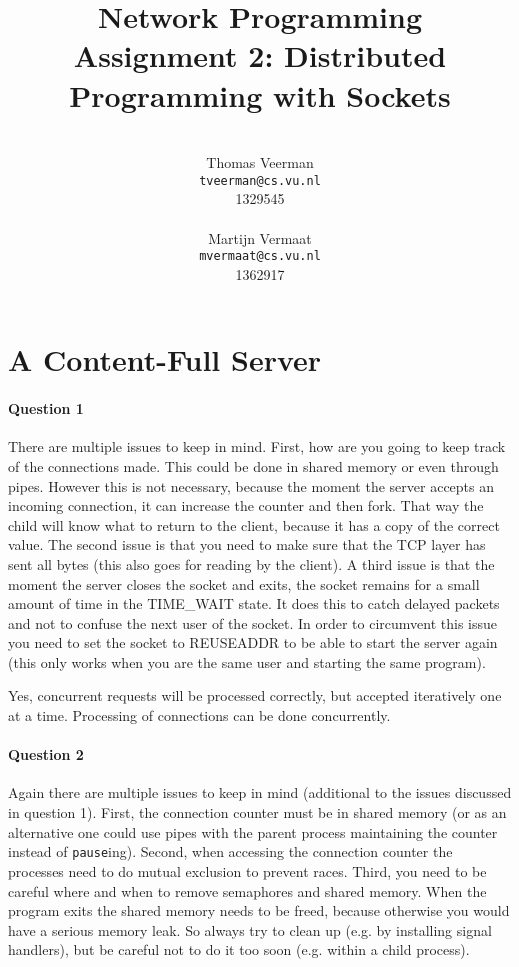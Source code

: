 \documentclass[a4paper,10pt]{article}
\title{Network Programming\\
\small{Assignment 2: Distributed Programming with Sockets}}
\author{%
        \mbox{}\\
        Thomas Veerman\\
        \texttt{tveerman@cs.vu.nl}\\
        1329545\\
        \mbox{}\\
        Martijn Vermaat\\
        \texttt{mvermaat@cs.vu.nl}\\
        1362917
}
\begin{document}
\maketitle

\section{A Content-Full Server}
\paragraph{Question 1}
There are multiple issues to keep in mind. First, how are you going to keep track of the connections made. This could be done in shared memory or even through pipes. However this is not necessary, because the moment the server accepts an incoming connection, it can increase the counter and then fork. That way the child will know what to return to the client, because it has a copy of the correct value. The second issue is that you need to make sure that the TCP layer has sent all bytes (this also goes for reading by the client). A third issue is that the moment the server closes the socket and exits, the socket remains for a small amount of time in the TIME\_WAIT state. It does this to catch delayed packets and not to confuse the next user of the socket. In order to circumvent this issue you need to set the socket to REUSEADDR to be able to start the server again (this only works when you are the same user and starting the same program).

Yes, concurrent requests will be processed correctly, but accepted iteratively one at a
time. Processing of connections can be done concurrently.

\paragraph{Question 2}
Again there are multiple issues to keep in mind (additional to the issues discussed in question 1). First, the connection counter must be in shared memory (or as an alternative one could use pipes with the parent process maintaining the counter instead of \texttt{pause}ing). Second, when accessing the connection counter the processes need to do mutual exclusion to prevent races. Third, you need to be careful where and when to remove semaphores and shared memory. When the program exits the shared memory needs to be freed, because otherwise you would have a serious memory leak. So always try to clean up (e.g. by installing signal handlers), but be careful not to do it too soon (e.g. within a child process).
\end{document}
